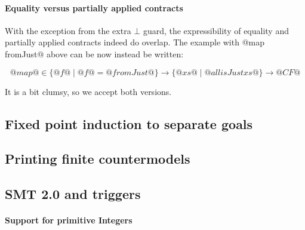 \paragraph{Equality versus partially applied contracts}

With the exception from the extra $\bot$ guard, the expressibility of
equality and partially applied contracts indeed do overlap. The example
with @map fromJust@ above can be now instead be written:

$$@map@ \in \{ @f@ \mid @f@ = @fromJust@ \} \to \{ @xs@ \mid @all isJust xs@ \} \to @CF@$$

It is a bit clumsy, so we accept both versions.

\subsection{Fixed point induction to separate goals}

\subsection{Printing finite countermodels}

\subsection{SMT 2.0 and triggers}
\paragraph{Support for primitive Integers}


